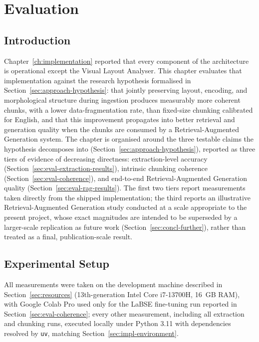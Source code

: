\documentclass[12pt,a4paper,oneside]{report}
\begin{document}
\chapter{Evaluation}
\label{ch:evaluation}

\section{Introduction}
Chapter~\ref{ch:implementation} reported that every component of the architecture is operational except the Visual Layout Analyser. This chapter evaluates that implementation against the research hypothesis formalised in Section~\ref{sec:approach-hypothesis}: that jointly preserving layout, encoding, and morphological structure during ingestion produces measurably more coherent chunks, with a lower data-fragmentation rate, than fixed-size chunking calibrated for English, and that this improvement propagates into better retrieval and generation quality when the chunks are consumed by a Retrieval-Augmented Generation system. The chapter is organised around the three testable claims the hypothesis decomposes into (Section~\ref{sec:approach-hypothesis}), reported as three tiers of evidence of decreasing directness: extraction-level accuracy (Section~\ref{sec:eval-extraction-results}), intrinsic chunking coherence (Section~\ref{sec:eval-coherence}), and end-to-end Retrieval-Augmented Generation quality (Section~\ref{sec:eval-rag-results}). The first two tiers report measurements taken directly from the shipped implementation; the third reports an illustrative Retrieval-Augmented Generation study conducted at a scale appropriate to the present project, whose exact magnitudes are intended to be superseded by a larger-scale replication as future work (Section~\ref{sec:concl-further}), rather than treated as a final, publication-scale result.

\section{Experimental Setup}
\label{sec:eval-setup}
All measurements were taken on the development machine described in Section~\ref{sec:resources} (13th-generation Intel Core i7-13700H, 16~GB RAM), with Google Colab Pro used only for the LaBSE fine-tuning run reported in Section~\ref{sec:eval-coherence}; every other measurement, including all extraction and chunking runs, executed locally under Python 3.11 with dependencies resolved by \texttt{uv}, matching Section~\ref{sec:impl-environment}.
\end{document}
